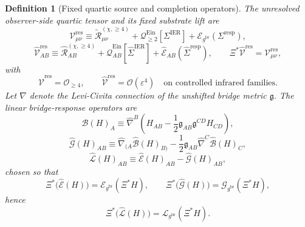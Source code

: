 \documentclass[11pt]{article}
\newcommand{\ObserverMap}{\Xi}
\newcommand{\BridgeMetric}{\mathfrak g}
\newcommand{\ObserverMetric}{g^{\mathrm{br}}}
\newcommand{\BaseShift}{\Sigma^{\mathrm{IER}}}
\newcommand{\ResponseShift}{\Sigma^{\mathrm{resp}}}
\newcommand{\BaseLift}{\widehat\Sigma^{\mathrm{IER}}}
\newcommand{\ResponseLift}{\widehat\Sigma^{\mathrm{resp}}}
\newcommand{\ReLongFour}{\widetilde{\mathcal R}_{\mu\nu}^{(\chi,\ge 4)}}
\newcommand{\ResidualCore}{\mathcal V_{\mu\nu}^{\mathrm{res}}}
\newcommand{\ResidualLift}{\widehat{\mathcal V}^{\mathrm{res}}}
\newcommand{\SubEinLin}{\widehat{\mathcal E}}
\newcommand{\SubGaugeVec}{\widehat{\mathcal B}}
\newcommand{\SubGaugeBook}{\widehat{\mathcal G}}
\newcommand{\SubReducedEin}{\widehat{\mathcal L}}
\newcommand{\ReducedEin}{\mathcal L_{\ObserverMetric}}
\newcommand{\GaugeBook}{\mathcal G_{\ObserverMetric}}
\newcommand{\EinLin}{\mathcal E_{\ObserverMetric}}
\newcommand{\EinQuad}{\mathcal Q_{\ge 2}^{\mathrm{Ein}}}
\newcommand{\epsIR}{\varepsilon}
\newtheorem{definition}{Definition}
\begin{document}
\begin{definition}[Fixed quartic source and completion operators]
\label{def:source}
The unresolved observer-side quartic tensor and its fixed substrate lift are
\begin{equation}
\ResidualCore
\equiv
\ReLongFour
+\EinQuad[\BaseShift]
+\EinLin(\ResponseShift),
\label{eq:vres}
\end{equation}
\begin{equation}
\ResidualLift_{AB}
\equiv
\widehat{\mathcal R}_{AB}^{(\chi,\ge 4)}
+\widehat{\mathcal Q}_{AB}^{\mathrm{Ein}}[\BaseLift]
+\widehat{\mathcal E}_{AB}(\ResponseLift),
\qquad
\ObserverMap^*\ResidualLift=\ResidualCore,
\label{eq:liftedsource}
\end{equation}
with
\begin{equation}
\ResidualLift=\mathcal O_{\ge 4},
\qquad
\ResidualLift=\mathcal O(\epsIR^4)
\quad
\text{on controlled infrared families.}
\label{eq:sourceorder}
\end{equation}
Let \(\widehat\nabla\) denote the Levi-Civita connection of the unshifted bridge metric \(\BridgeMetric\). The linear bridge-response operators are
\begin{equation}
\SubGaugeVec(H)_A
\equiv
\widehat\nabla^B\!\left(
H_{AB}
-\frac12 \BridgeMetric_{AB}\BridgeMetric^{CD}H_{CD}
\right),
\label{eq:subB}
\end{equation}
\begin{equation}
\SubGaugeBook(H)_{AB}
\equiv
\widehat\nabla_{(A}\SubGaugeVec(H)_{B)}
-\frac12 \BridgeMetric_{AB}\widehat\nabla^C\SubGaugeVec(H)_C,
\label{eq:subG}
\end{equation}
\begin{equation}
\SubReducedEin(H)_{AB}
\equiv
\SubEinLin(H)_{AB}-\SubGaugeBook(H)_{AB},
\label{eq:subL}
\end{equation}
chosen so that
\begin{equation}
\ObserverMap^*\bigl(\SubEinLin(H)\bigr)=\EinLin(\ObserverMap^*H),
\qquad
\ObserverMap^*\bigl(\SubGaugeBook(H)\bigr)=\GaugeBook(\ObserverMap^*H),
\label{eq:intertwine1}
\end{equation}
hence
\begin{equation}
\ObserverMap^*\bigl(\SubReducedEin(H)\bigr)
=
\ReducedEin(\ObserverMap^*H).
\label{eq:intertwine2}
\end{equation}
\end{definition}
\end{document}
